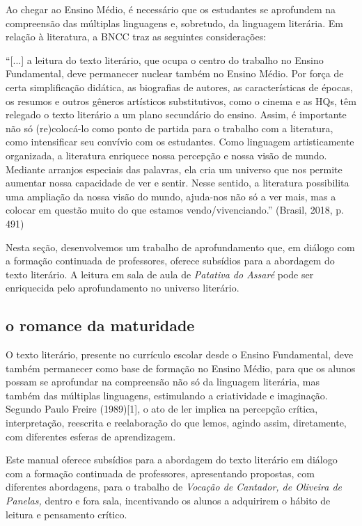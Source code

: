\documentclass[12pt]{extarticle}
\begin{document}
Ao chegar ao Ensino Médio, é necessário que os estudantes se aprofundem
na compreensão das múltiplas linguagens e, sobretudo, da linguagem
literária. Em relação à literatura, a BNCC traz as seguintes
considerações:

``{[}...{]} a leitura do texto literário, que ocupa o centro do trabalho
no Ensino Fundamental, deve permanecer nuclear também no Ensino Médio.
Por força de certa simplificação didática, as biografias de autores, as
características de épocas, os resumos e outros gêneros artísticos
substitutivos, como o cinema e as HQs, têm relegado o texto literário a
um plano secundário do ensino. Assim, é importante não só (re)colocá-lo
como ponto de partida para o trabalho com a literatura, como
intensificar seu convívio com os estudantes. Como linguagem
artisticamente organizada, a literatura enriquece nossa percepção e
nossa visão de mundo. Mediante arranjos especiais das palavras, ela cria
um universo que nos permite aumentar nossa capacidade de ver e sentir.
Nesse sentido, a literatura possibilita uma ampliação da nossa visão do
mundo, ajuda-nos não só a ver mais, mas a colocar em questão muito do
que estamos vendo/vivenciando.'' (Brasil, 2018, p. 491)

Nesta seção, desenvolvemos um trabalho de aprofundamento que, em diálogo
com a formação continuada de professores, oferece subsídios para a
abordagem do texto literário. A leitura em sala de aula de
\emph{Patativa do Assaré} pode ser enriquecida pelo aprofundamento no
universo literário.

\subsection{o romance da maturidade}

O texto literário, presente no currículo escolar desde o Ensino
Fundamental, deve também permanecer como base de formação no Ensino
Médio, para que os alunos possam se aprofundar na compreensão não só da
linguagem literária, mas também das múltiplas linguagens, estimulando a
criatividade e imaginação. Segundo Paulo Freire (1989){[}1{]}, o ato de
ler implica na percepção crítica, interpretação, reescrita e
reelaboração do que lemos, agindo assim, diretamente, com diferentes
esferas de aprendizagem.

Este manual oferece subsídios para a abordagem do texto literário em
diálogo com a formação continuada de professores, apresentando
propostas, com diferentes abordagens, para o trabalho de \emph{Vocação
de Cantador, de Oliveira de Panelas,} dentro e fora sala, incentivando
os alunos a adquirirem o hábito de leitura e pensamento crítico.
\end{document}
